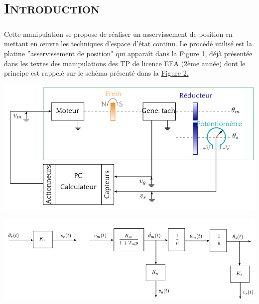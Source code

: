 \chapter*{\textsc{Introduction}}
	
	\paragraph{}
		Cette manipulation se propose de réaliser un asservissement de position en mettant en œuvre les techniques d’espace d’état continu. Le procédé utilisé est la platine ”asservissement de position" qui apparaît dans la \hyperref[fig1]{Figure 1}, déjà présentée dans les textes des manipulations des TP de licence EEA (2ème année) dont le principe est rappelé sur le schéma présenté dans la \hyperref[fig2]{Figure 2.}

	\begin{center}
	\includegraphics[scale=0.4]{schemamotor.png}
	\label{fig1} 
	\end{center} 
	
	\begin{center}
	\includegraphics[scale=0.4]{schemablocmotor.png}
	\label{fig2} 
	\end{center}
	
